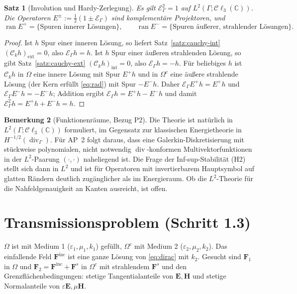 \documentclass[11pt, a4paper]{article}
\newcommand{\mvec}[1]{\boldsymbol{#1}}
\newcommand{\clc}{\mathcal{C}\ell_{3}(\mathbb{C})}
\newcommand{\EG}{\mathcal{E}_\Gamma}
\theoremstyle{plain}
\newtheorem{satz}{Satz}[section]
\theoremstyle{definition}
\newtheorem{bemerkung}[satz]{Bemerkung}
\newcommand{\status}[1]{\hfill{\small\sffamily[#1]}}
\begin{document}
\begin{satz}[Involution und Hardy-Zerlegung]\label{satz:involution}\status{bewiesen, modulo Plemelj}
Es gilt $\EG^2 = 1$ auf $L^2(\Gamma;\clc)$. Die Operatoren
$E^\pm := \tfrac12(1\pm\EG)$ sind komplementäre Projektoren, und
\[
  \operatorname{ran}E^+ = \{\text{Spuren innerer Lösungen}\},\qquad
  \operatorname{ran}E^- = \{\text{Spuren äußerer, strahlender Lösungen}\}.
\]
\end{satz}
\begin{proof}
Ist $h$ Spur einer inneren Lösung, so liefert Satz~\ref{satz:cauchy-int}
$(\mathcal{C}_kh)_{\mathrm{ext}}=0$, also $\EG h = h$. Ist $h$ Spur einer
äußeren strahlenden Lösung, so gibt Satz~\ref{satz:cauchy-ext}
$(\mathcal{C}_kh)_{\mathrm{int}} = 0$, also $\EG h = -h$. Für beliebiges $h$ ist
$\mathcal{C}_kh$ in $\Omega$ eine innere Lösung mit Spur $E^+h$ und in $\Omega^c$
eine äußere strahlende Lösung (der Kern erfüllt \eqref{eq:rad}) mit Spur
$-E^-h$. Daher $\EG E^+h = E^+h$ und $\EG E^-h = -E^-h$; Addition ergibt
$\EG h = E^+h - E^-h$ und damit $\EG^2 h = E^+h + E^-h = h$.
\end{proof}

\begin{bemerkung}[Funktionenräume, Bezug P2]\label{bem:raeume}
Die Theorie ist natürlich in $L^2(\Gamma;\clc)$ formuliert, im Gegensatz zur
klassischen Energietheorie in $H^{-1/2}(\operatorname{div}_\Gamma)$. Für AP~2
folgt daraus, dass eine Galerkin-Diskretisierung mit stückweise polynomialen,
nicht notwendig $\operatorname{div}$-konformen Multivektorfunktionen in der
$L^2$-Paarung $(\cdot,\cdot)$ naheliegend ist. Die Frage der Inf-sup-Stabilität
(H2) stellt sich dann in $L^2$ und ist für Operatoren mit invertierbarem
Hauptsymbol auf glatten Rändern deutlich zugänglicher als im Energieraum.
Ob die $L^2$-Theorie für die Nahfeldgenauigkeit an Kanten ausreicht, ist offen.
\end{bemerkung}

\section{Transmissionsproblem (Schritt 1.3)}

$\Omega$ ist mit Medium 1 ($\varepsilon_1,\mu_1,k_1$) gefüllt, $\Omega^c$ mit Medium 2
($\varepsilon_2,\mu_2,k_2$). Das einfallende Feld $\mvec{F}^{\mathrm{inc}}$ ist eine
ganze Lösung von \eqref{eq:dirac} mit $k_2$. Gesucht sind $\mvec{F}_1$ in
$\Omega$ und $\mvec{F}_2 = \mvec{F}^{\mathrm{inc}}+\mvec{F}^s$ in $\Omega^c$ mit
strahlendem $\mvec{F}^s$ und den Grenzflächenbedingungen: stetige
Tangentialanteile von $\mvec{E},\mvec{H}$ und stetige Normalanteile von
$\varepsilon\mvec{E},\mu\mvec{H}$.
\end{document}
